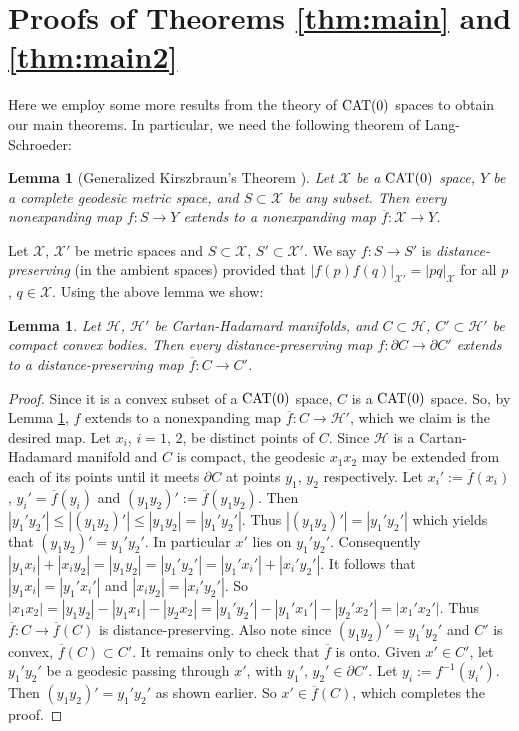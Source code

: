 \documentclass[11pt]{amsart}
\newtheorem{lemma}[theorem]{Lemma}
\theoremstyle{definition}
\newcommand{\ol}{\overline}
\begin{document}
\section{Proofs of Theorems \ref{thm:main} and \ref{thm:main2}}\label{sec:proof}
Here we employ some more results from the theory of $\textup{CAT}(0)$ spaces  to obtain our main theorems. In particular, we need the following theorem of Lang-Schroeder:

\begin{lemma}[Generalized Kirszbraun's Theorem \cite{lang-schroeder1997}]\label{lem:lang-schroeder}
Let $\mathcal{X}$ be a $\textup{CAT}(0)$ space, $Y$ be a complete geodesic metric space, and $S\subset \mathcal{X}$ be any subset. Then every nonexpanding map $f\colon S\to Y$ extends to a nonexpanding map $\ol f\colon \mathcal{X}\to Y$.
\end{lemma}

 Let $\mathcal{X}$, $\mathcal{X}'$ be metric spaces and $S\subset \mathcal{X}$, $S'\subset \mathcal{X}'$. We say $f\colon S\to S'$ is \emph{distance-preserving} (in the ambient spaces) provided that $|f(p)f(q)|_{\mathcal{X}'}=|pq|_{\mathcal{X}}$ for all $p$, $q\in\mathcal{X}$. Using the above lemma we show:

\begin{lemma}\label{lem:C}
Let $\mathcal{H}$,  $\mathcal{H}'$ be Cartan-Hadamard manifolds, and $C\subset \mathcal{H}$, $C'\subset \mathcal{H}'$  be compact convex bodies. Then every distance-preserving map $f\colon\partial C\to  \partial C'$ extends to a distance-preserving map  $\ol f\colon C\to C'$. 
\end{lemma}
\begin{proof}
Since it is a convex subset of a $\textup{CAT}(0)$ space, $C$ is  a $\textup{CAT}(0)$ space. So,
by Lemma \ref{lem:lang-schroeder}, $f$ extends to a nonexpanding map $\ol f\colon C\to \mathcal{H}'$, which we claim is the desired map.
Let $x_i$, $i=1$, $2$, be distinct points of $C$. Since  $\mathcal{H}$ is a Cartan-Hadamard manifold and $C$ is compact, the geodesic $x_1x_2$ may be extended from each of its points until it meets $\partial C$ at points $y_1$, $y_2$ respectively. 
 Let $x_i':=\ol f(x_i)$, $y_i'=\ol f(y_i)$ and $(y_1y_2)':=\ol f(y_1y_2)$.  Then $|y_1'y_2'|\leq |(y_1y_2)'|\leq |y_1y_2|=|y_1'y_2'|$. Thus $|(y_1y_2)'|=|y_1'y_2'|$ which yields that $(y_1y_2)'=y_1'y_2'$. In particular $x'$ lies on $y_1'y_2'$. Consequently $|y_1x_i|+|x_iy_2|=|y_1y_2|=|y_1'y_2'|=|y_1' x_i'|+|x_i'y_2'|$. It follows that
$|y_1 x_i|=|y_1' x_i'|$ and $|x_iy_2|=|x_i'y_2'|$. So $|x_1x_2|=|y_1y_2|-|y_1x_1|-|y_2x_2|=|y_1'y_2'|-|y_1'x_1'|-|y_2'x_2'|=|x_1'x_2'|$. Thus $\ol f\colon C\to \ol f(C)$ is distance-preserving. Also note since $(y_1y_2)'=y_1'y_2'$ and $C'$ is convex, $\ol f(C)\subset C'$. It remains only to check that $\ol f$ is onto. Given $x'\in C'$, let $y_1'y_2'$ be a geodesic passing through $x'$, with $y_1'$, $y_2'\in\partial C'$. Let $y_i:=f^{-1}(y_i')$. Then $(y_1y_2)'=y_1'y_2'$ as shown earlier. So $x'\in\ol f(C)$, which completes the proof.
\end{proof}
\end{document}
